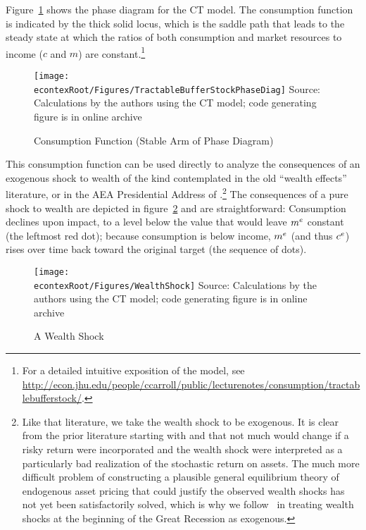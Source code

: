 \documentclass[titlepage]{\econtex}
\begin{document}
Figure~\ref{fig:PhaseDiag} shows the phase diagram for the CT model.
The consumption function is indicated by the thick solid locus, which is the
saddle path that leads to the steady state at which the ratios of
both consumption and market resources to income ($c$ and $m$) are constant.\footnote{For a detailed
intuitive exposition of the model, see \\
\url{http://econ.jhu.edu/people/ccarroll/public/lecturenotes/consumption/tractablebufferstock/}.}

\begin{figure}
\caption{Consumption Function (Stable Arm of Phase Diagram)}\label{fig:PhaseDiag}
\texttt{[image: \\econtexRoot/Figures/TractableBufferStockPhaseDiag]}
\tiny Source: Calculations by the authors using the CT  model; code generating figure is in online archive
\end{figure}

This consumption function can be used directly to analyze the consequences of an exogenous shock
to wealth of the kind contemplated in the old ``wealth effects'' literature, or in the AEA Presidential Address of \cite{hall:slump}.\footnote{Like that literature,
we take the wealth shock to be exogenous.  It is clear from the prior
literature starting with \cite{merton:restat} and \cite{samuelson:portfolio} that not much would change if a risky return were incorporated and the wealth shock were interpreted as a particularly bad realization
of the stochastic return on assets.  The much more difficult problem of constructing a plausible general equilibrium theory
of endogenous asset pricing that could justify the observed wealth shocks has not yet been satisfactorily solved, which is why we follow~\cite{hall:slump} in treating wealth shocks at the beginning of the Great Recession as exogenous.}  The consequences of a pure shock to wealth are depicted in figure~\ref{fig:WealthShock} and are straightforward: Consumption declines upon impact, to a level below the value that would leave $m^{e}$ constant (the leftmost red dot); because consumption is below income, $m^{e}$ (and thus $c^{e}$) rises over time back toward the original target (the sequence of dots).

\begin{figure}
\caption{A Wealth Shock}\label{fig:WealthShock}
\texttt{[image: \\econtexRoot/Figures/WealthShock]}
\tiny Source: Calculations by the authors using the CT  model; code generating figure is in online archive
\end{figure}
\end{document}
